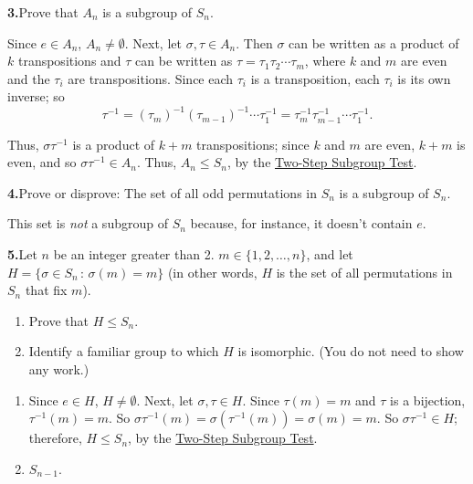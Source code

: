 \documentclass[10pt,]{book}
\theoremstyle{plain}
\theoremstyle{definition}
\theoremstyle{definition}
\theoremstyle{definition}
\theoremstyle{definition}
\numberwithin{equation}{section}
\begin{document}
\par\smallskip
\noindent\textbf{3.}\quad{}Prove that \(A_n\) is a subgroup of \(S_n\).%
\par\smallskip
Since \(e\in A_n\), \(A_n\neq \emptyset\). Next, let \(\sigma, \tau \in A_n\). Then \(\sigma\) can be written as a product of \(k\) transpositions and \(\tau\) can be written as \(\tau=\tau_1\tau_2\cdots \tau_m\), where \(k\) and \(m\) are even and the \(\tau_i\) are transpositions. Since each \(\tau_i\) is a transposition, each \(\tau_i\) is its own inverse; so%
\begin{equation*}
\tau^{-1}=(\tau_m)^{-1}(\tau_{m-1})^{-1}\cdots \tau_1^{-1}=\tau_m^{-1}\tau_{m-1}^{-1}\cdots \tau_1^{-1}.
\end{equation*}
%
\par
Thus, \(\sigma \tau^{-1}\) is a product of \(k+m\) transpositions; since \(k\) and \(m\) are even, \(k+m\) is even, and so \(\sigma \tau^{-1}\in A_n\). Thus, \(A_n\leq S_n\), by the \hyperref[twostep]{Two-Step Subgroup Test}.%
\par\smallskip
\noindent\textbf{4.}\quad{}Prove or disprove: The set of all odd permutations in \(S_n\) is a subgroup of \(S_n\).%
\par\smallskip
This set is \emph{not} a subgroup of \(S_n\) because, for instance, it doesn't contain \(e\).%
\par\smallskip
\noindent\textbf{5.}\quad{}Let \(n\) be an integer greater than 2. \(m \in \{1,2,\ldots,n\}\), and let \(H=\{\sigma\in S_n\,:\,\sigma(m)=m\}\) (in other words, \(H\) is the set of all permutations in \(S_n\) that fix \(m\)). \leavevmode%
\begin{enumerate}[label=(\alph*)]
\item\hypertarget{li-379}{}Prove that \(H\leq S_n\).%
\item\hypertarget{li-380}{}Identify a familiar group to which \(H\) is isomorphic. (You do not need to show any work.)%
\end{enumerate}
%
\par\smallskip
\leavevmode%
\begin{enumerate}[label=(\alph*)]
\item\hypertarget{li-381}{}Since \(e\in H\), \(H\neq \emptyset\).  Next, let \(\sigma, \tau\in H\).  Since \(\tau(m)=m\) and \(\tau\) is a bijection, \(\tau^{-1}(m)=m\).  So \(\sigma \tau^{-1}(m)=\sigma(\tau^{-1}(m))=\sigma(m)=m\).  So \(\sigma \tau^{-1}\in H\); therefore, \(H\leq S_n\), by the \hyperref[twostep]{Two-Step Subgroup Test}.%
\item\hypertarget{li-382}{}\(S_{n-1}\).%
\end{enumerate}
\end{document}
